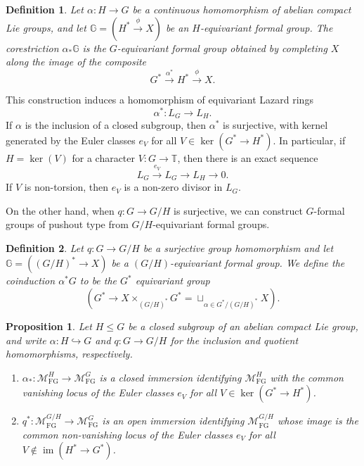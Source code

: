 \documentclass[11pt,reqno]{amsart}
\newtheorem{proposition}[proposition]{Proposition}
\newtheorem{definition}[definition]{Definition}
\newcommand{\im}{\operatorname{im}}
\newcommand{\MFG}{\mathcal M_{\mathrm{FG}}}
\newcommand{\bbT}{\mathbb T}
\begin{document}
\begin{definition}
Let $\alpha\colon H\to G$ be a continuous homomorphism of abelian compact Lie groups, and let $\mathbb G=(H^*\xrightarrow{\phi}X)$ be an $H$-equivariant formal group. The \emph{corestriction} $\alpha_*\mathbb G$ is the $G$-equivariant formal group obtained by completing $X$ along the image of the composite
\[
G^*\xrightarrow{\alpha^*}H^*\xrightarrow{\phi}X.
\]
\end{definition}

This construction induces a homomorphism of equivariant Lazard rings
\[
\alpha^*\colon L_G\longrightarrow L_H.
\]
If $\alpha$ is the inclusion of a closed subgroup, then $\alpha^*$ is surjective, with kernel generated by the Euler classes $e_V$ for all $V\in\ker(G^*\to H^*)$. In particular, if $H=\ker(V)$ for a character $V\colon G\to\bbT$, then there is an exact sequence
\[
L_G\xrightarrow{\,e_V\,}L_G\longrightarrow L_H\longrightarrow 0.
\]
If $V$ is non-torsion, then $e_V$ is a non-zero divisor in $L_G$.


On the other hand, when $q:G\to G/H$ is surjective, we can construct $G$-formal groups of pushout type from $G/H$-equivariant formal groups.
\begin{definition}
    Let $q:G\to G/H$ be a surjective group homomorphism and let $\mathbb G=((G/H)^*\to X)$ be a $(G/H)$-equivariant formal group. We define the coinduction $\alpha^* G$ to be the $G^*$ equivariant group $$(G^*\to X\times_{(G/H)^*}G^*=\sqcup_{\alpha\in G^*/(G/H)^*} X).$$ 
\end{definition}





\begin{proposition}{\cite[Proposition 3.11]{hausmann2023invariant}}\label{prop:substacks}
    Let $H\leq G$ be a closed subgroup of an abelian compact Lie group, and write $\alpha\colon H\hookrightarrow G$ and $q\colon G\to G/H$ for the inclusion and quotient homomorphisms, respectively. 
    \begin{enumerate}[label=\textup{(\roman*)}]
      \item $\alpha_*\colon\MFG^H\to\MFG^G$ is a closed immersion identifying $\MFG^H$ with the common vanishing locus of the Euler classes $e_V$ for all $V\in\ker(G^*\to H^*)$.
      \item $q^*\colon\MFG^{G/H}\to\MFG^G$ is an open immersion identifying $\MFG^{G/H}$ whose image is the common non-vanishing locus of the Euler classes $e_V$ for all $V\notin \im(H^*\to G^*)$.
    \end{enumerate}
\end{proposition}
\end{document}
